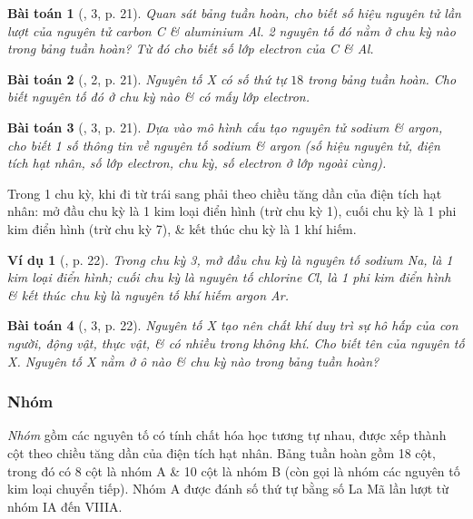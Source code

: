 \documentclass{article}
\newtheorem{baitoan}{Bài toán}
\newtheorem{vidu}{Ví dụ}
\begin{document}
\begin{baitoan}[\cite{SGK_KHTN_7_Canh_Dieu}, 3, p. 21]
	Quan sát bảng tuần hoàn, cho biết số hiệu nguyên tử lần lượt của nguyên tử carbon \emph{C} \& aluminium \emph{Al}. 2 nguyên tố đó nằm ở chu kỳ nào trong bảng tuần hoàn? Từ đó cho biết số lớp electron của \emph{C} \& \emph{Al}.
\end{baitoan}

\begin{baitoan}[\cite{SGK_KHTN_7_Canh_Dieu}, 2, p. 21]
	Nguyên tố X có số thứ tự $18$ trong bảng tuần hoàn. Cho biết nguyên tố đó ở chu kỳ nào \& có mấy lớp electron.
\end{baitoan}

\begin{baitoan}[\cite{SGK_KHTN_7_Canh_Dieu}, 3, p. 21]
	Dựa vào mô hình cấu tạo nguyên tử sodium \& argon, cho biết 1 số thông tin về nguyên tố sodium \& argon (số hiệu nguyên tử, điện tích hạt nhân, số lớp electron, chu kỳ, số electron ở lớp ngoài cùng).
\end{baitoan}
Trong 1 chu kỳ, khi đi từ trái sang phải theo chiều tăng dần của điện tích hạt nhân: mở đầu chu kỳ là 1 kim loại điển hình (trừ chu kỳ 1), cuối chu kỳ là 1 phi kim điển hình (trừ chu kỳ 7), \& kết thúc chu kỳ là 1 khí hiếm.

\begin{vidu}[\cite{SGK_KHTN_7_Canh_Dieu}, p. 22]
	 Trong chu kỳ 3, mở đầu chu kỳ là nguyên tố sodium \emph{Na}, là 1 kim loại điển hình; cuối chu kỳ là nguyên tố chlorine \emph{Cl}, là 1 phi kim điển hình \& kết thúc chu kỳ là nguyên tố khí hiếm argon \emph{Ar}.
\end{vidu}

\begin{baitoan}[\cite{SGK_KHTN_7_Canh_Dieu}, 3, p. 22]
	Nguyên tố X tạo nên chất khí duy trì sự hô hấp của con người, động vật, thực vật, \& có nhiều trong không khí. Cho biết tên của nguyên tố X. Nguyên tố X nằm ở ô nào \& chu kỳ nào trong bảng tuần hoàn?
\end{baitoan}

\subsubsection{Nhóm}
\textit{Nhóm} gồm các nguyên tố có tính chất hóa học tương tự nhau, được xếp thành cột theo chiều tăng dần của điện tích hạt nhân. Bảng tuần hoàn gồm 18 cột, trong đó có 8 cột là nhóm A \& 10 cột là nhóm B (còn gọi là nhóm các nguyên tố kim loại chuyển tiếp). Nhóm A được đánh số thứ tự bằng số La Mã lần lượt từ nhóm IA đến VIIIA.
\end{document}
